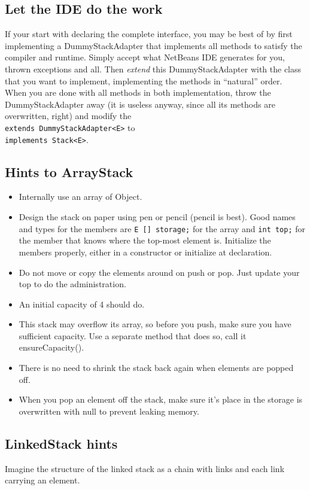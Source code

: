 \documentclass[twocolumn,a4paper]{article}
\providecommand\Code[1]{{\color{fontys}\ttfamily#1}}
\begin{document}
\subsection*{Let the IDE do the work}
If your start with declaring the complete interface, you may be best
of by first implementing a \Code{DummyStackAdapter} that implements all
methods to satisfy the compiler and runtime. Simply accept what NetBeans IDE
generates for you, thrown exceptions and all. Then \textit{extend}
this \Code{DummyStackAdapter} with the class that you want to implement,
implementing the methods in ``natural'' order. When you are done with
all methods in both implementation, throw the \Code{DummyStackAdapter} away (it is
useless anyway, since all its methods are overwritten, right) and
modify the\\
\lstinline{extends DummyStackAdapter<E>} to\\ 
\lstinline{implements Stack<E>}.

\subsection*{Hints to ArrayStack}
\begin{itemize}
\item Internally use an array of Object.
\item Design the stack on paper using pen or pencil (pencil is best).
  Good names and types for the members are
  \lstinline{E [] storage;} for the array and \lstinline{int top;} for the
  member that knows where the top-most element is. Initialize the members
  properly, either in a constructor or initialize at declaration.
\item Do not move or copy the elements around on push or pop. 
  Just update your \Code{top} to
  do the administration. 
\item An initial capacity of 4 should do.
\item This stack may overflow its array, so before you push, make
  sure you have sufficient capacity. Use a separate method that does
  so, call it \Code{ensureCapacity()}.
\item There is no need to shrink the stack back again when elements are
  popped off.
\item When you pop an element off the stack, make sure it's place in the
  storage is overwritten with \Code{null} to prevent leaking memory.
\end{itemize}

\subsection*{LinkedStack hints}\sloppypar
Imagine the structure of the linked stack as a chain with links and each
link carrying an element.
\end{document}
